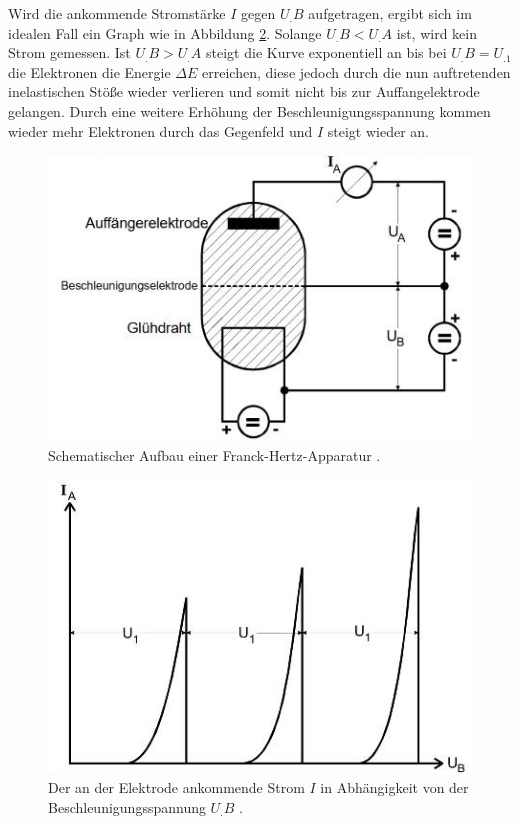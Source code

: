 Wird die ankommende Stromstärke $I$ gegen $U_.B$ aufgetragen, ergibt sich im idealen Fall ein Graph wie in Abbildung \ref{fig:I_theo}.
Solange $U_.B<U_.A$ ist, wird kein Strom gemessen. Ist $U_.B>U_.A$ steigt die Kurve exponentiell an bis bei 
$U_.B=U_.1$ die Elektronen die Energie $\Delta E$ erreichen, diese jedoch durch die nun auftretenden inelastischen Stöße wieder verlieren und somit nicht bis zur Auffangelektrode gelangen. Durch eine weitere Erhöhung der Beschleunigungsspannung kommen wieder mehr Elektronen durch das Gegenfeld und $I$  steigt wieder an.
\begin{figure}
\includegraphics[width=\linewidth-50pt,height=\textheight-50pt,keepaspectratio]{content/images/apparatur.jpg}
\caption{Schematischer Aufbau einer Franck-Hertz-Apparatur \cite{V601}.}
\label{fig:apparat}
\end{figure}
\begin{figure}
\centering
\includegraphics[width=\linewidth-50pt,height=\textheight-50pt,keepaspectratio]{content/images/I_theo.jpg}
\caption{Der an der Elektrode ankommende Strom $I$ in Abhängigkeit von der Beschleunigungsspannung $U_.B$ \cite{V601}.}
\label{fig:I_theo}
\end{figure}
